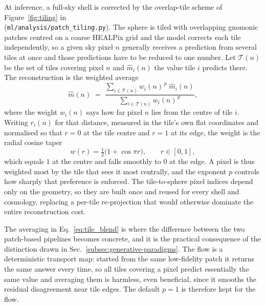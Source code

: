 \documentclass{report}
\begin{document}
At inference, a full-sky shell is corrected by the overlap-tile scheme of Figure~\ref{fig:tiling} in \\ (\texttt{ml/analysis/patch\_tiling.py}). The sphere is tiled with overlapping gnomonic patches centred on a coarse HEALPix grid and the model corrects each tile independently, so a given sky pixel \mbox{$n$} generally receives a prediction from several tiles at once and those predictions have to be reduced to one number. Let \mbox{$\mathcal{T}(n)$} be the set of tiles covering pixel \mbox{$n$} and \mbox{$\hat m_i(n)$} the value tile \mbox{$i$} predicts there. The reconstruction is the weighted average
\begin{equation}
  \hat m(n) \;=\; \frac{\sum_{i \in \mathcal{T}(n)} w_i(n)^{\,p}\; \hat m_i(n)}{\sum_{i \in \mathcal{T}(n)} w_i(n)^{\,p}},
  \label{eq:tile_blend}
\end{equation}
where the weight \mbox{$w_i(n)$} says how far pixel \mbox{$n$} lies from the centre of tile \mbox{$i$}. Writing \mbox{$r_i(n)$} for that distance, measured in the tile's own flat coordinates and normalised so that \mbox{$r = 0$} at the tile centre and \mbox{$r = 1$} at its edge, the weight is the radial cosine taper
\begin{equation}
  w(r) = \tfrac12\big(1 + \cos \pi r\big), \qquad r \in [0,1],
  \label{eq:cosine_taper}
\end{equation}
which equals \mbox{$1$} at the centre and falls smoothly to \mbox{$0$} at the edge. A pixel is thus weighted most by the tile that sees it most centrally, and the exponent \mbox{$p$} controls how sharply that preference is enforced. The tile-to-sphere pixel indices depend only on the geometry, so they are built once and reused for every shell and cosmology, replacing a per-tile re-projection that would otherwise dominate the entire reconstruction cost.

The averaging in Eq.~\eqref{eq:tile_blend} is where the difference between the two patch-based pipelines becomes concrete, and it is the practical consequence of the distinction drawn in Sec.~\ref{subsec:generative-paradigms}. The flow is a deterministic transport map: started from the same low-fidelity patch it returns the same answer every time, so all tiles covering a pixel predict essentially the same value and averaging them is harmless, even beneficial, since it smooths the residual disagreement near tile edges. The default \mbox{$p=1$} is therefore kept for the flow.
\end{document}
